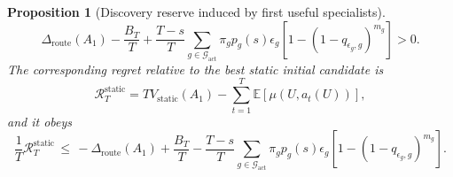 \documentclass{article} %
\newtheorem{proposition}[theorem]{Proposition}
\begin{document}
\begin{proposition}[Discovery reserve induced by first useful specialists]
\begin{equation}
\label{eq:app-third-reserve-positive}
\Delta_{\mathrm{route}}(A_1)
-
\frac{B_T}{T}
+
\frac{T-s}{T}
\sum_{g\in\mathcal{G}_{\mathrm{act}}}
\pi_g
p_g(s)
\epsilon_g
\left[
1-(1-q_{\epsilon_g,g})^{m_g}
\right]
>
0.
\end{equation}
The corresponding regret relative to the best static initial candidate is
\begin{equation}
\label{eq:app-third-static-regret}
\mathcal{R}_{T}^{\mathrm{static}}
=
T V_{\mathrm{static}}(A_1)
-
\sum_{t=1}^{T}
\mathbb{E}[\mu(U,a_t(U))],
\end{equation}
and it obeys
\begin{equation}
\label{eq:app-third-static-regret-bound}
\frac{1}{T}
\mathcal{R}_{T}^{\mathrm{static}}
\,\le\,
-
\Delta_{\mathrm{route}}(A_1)
+
\frac{B_T}{T}
-
\frac{T-s}{T}
\sum_{g\in\mathcal{G}_{\mathrm{act}}}
\pi_g
p_g(s)
\epsilon_g
\left[
1-(1-q_{\epsilon_g,g})^{m_g}
\right].
\end{equation}
\end{proposition}
\end{document}
